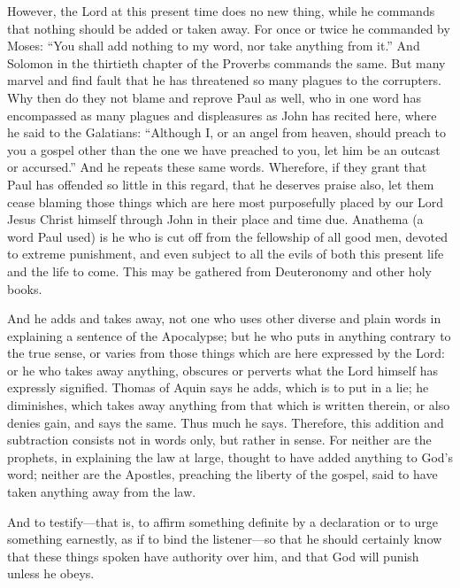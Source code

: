 However, the Lord at this present time does no new thing, while he commands that nothing should be added or taken away. For once or twice he commanded by Moses: “You shall add nothing to my word, nor take anything from it.” And Solomon in the thirtieth chapter of the Proverbs commands the same. But many marvel and find fault that he has threatened so many plagues to the corrupters. Why then do they not blame and reprove Paul as well, who in one word has encompassed as many plagues and displeasures as John has recited here, where he said to the Galatians: “Although I, or an angel from heaven, should preach to you a gospel other than the one we have preached to you, let him be an outcast or accursed.” And he repeats these same words. Wherefore, if they grant that Paul has offended so little in this regard, that he deserves praise also, let them cease blaming those things which are here most purposefully placed by our Lord Jesus Christ himself through John in their place and time due. Anathema (a word Paul used) is he who is cut off from the fellowship of all good men, devoted to extreme punishment, and even subject to all the evils of both this present life and the life to come. This may be gathered from Deuteronomy and other holy books.

And he adds and takes away, not one who uses other diverse and plain words in explaining a sentence of the Apocalypse; but he who puts in anything contrary to the true sense, or varies from those things which are here expressed by the Lord: or he who takes away anything, obscures or perverts what the Lord himself has expressly signified. Thomas of Aquin says he adds, which is to put in a lie; he diminishes, which takes away anything from that which is written therein, or also denies gain, and says the same. Thus much he says. Therefore, this addition and subtraction consists not in words only, but rather in sense. For neither are the prophets, in explaining the law at large, thought to have added anything to God’s word; neither are the Apostles, preaching the liberty of the gospel, said to have taken anything away from the law.

And to testify—that is, to affirm something definite by a declaration or to urge something earnestly, as if to bind the listener—so that he should certainly know that these things spoken have authority over him, and that God will punish unless he obeys.

